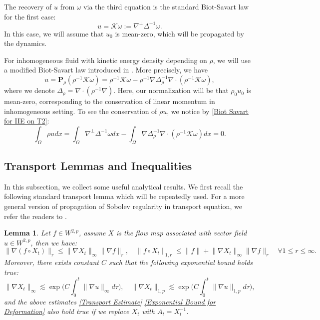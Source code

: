 \documentclass[12pt,letterpaper]{article}
\newcommand{\bP}{\mathbf{P}}
\newtheorem{lem}[thm]{Lemma}
\theoremstyle{plain}
\begin{document}
The recovery of $u$ from $\omega$ via the third equation is the standard Biot-Savart law for the first case:
\begin{equation*}
u=\mathcal K\omega:=\nabla^\perp\Delta^{-1}\omega.    
\end{equation*}
In this case, we will assume that $u_0$ is mean-zero, which will be propagated by the dynamics.

For inhomogeneous fluid with kinetic energy density depending on $\rho$, we will use a modified Biot-Savart law introduced in \cite{Pan2025LagrangianIIE}. More precisely, we have
\begin{equation}\label{Biot Savart for IIE on T2}
 u=\bP_\rho(\rho^{-1}\mathcal K\omega)= \rho^{-1}\mathcal K\omega-\rho^{-1}\nabla\Delta_{\rho}^{-1} \nabla\cdot( \rho^{-1}\mathcal K\omega),
\end{equation}
where we denote $\Delta_\rho=\nabla\cdot(\rho^{-1}\nabla)$. Here, our normalization will be that $\rho_0 u_0$ is mean-zero, corresponding to the conservation of linear momentum in inhomogeneous setting. To see the conservation of $\rho u$, we notice by \eqref{Biot Savart for IIE on T2}:
\begin{equation*}
 \int_\Omega \rho u dx =\int_\Omega \nabla^\perp\Delta^{-1}\omega dx-\int_\Omega \nabla\Delta_{\rho}^{-1} \nabla\cdot( \rho^{-1}\mathcal K\omega)dx=0.  
\end{equation*}

\subsection{Transport Lemmas and Inequalities}
In this subsection, we collect some useful analytical results. We first recall the following standard transport lemma which will be repeatedly used. For a more general version of propagation of Sobolev regularity in transport equation, we refer the readers to \cite{BCD11}.
\begin{lem}\label{Regularity of Transport}
 Let $f\in W^{2,p}$, assume  $X$ is the flow map associated with vector field $u\in W^{2,p}$, then we have:
 \begin{equation}\label{Transport Estimate}
   \lVert\nabla(f\circ X_t)\rVert_r\le \lVert\nabla X_t\rVert_\infty\lVert \nabla f\rVert_r,\quad \lVert f\circ X_t\rVert_{1,r}\le \lVert f\rVert+\lVert\nabla X_t\rVert_\infty \lVert \nabla f\rVert_r\quad\forall 1\le r\le \infty.
 \end{equation}
 Moreover, there exists constant $C$ such that the following exponential bound holds true:
 \begin{equation}\label{Exponential Bound for Deformation}
 \lVert\nabla X_t\rVert_\infty\lesssim \exp\bigg(C\int_0^t\lVert\nabla u\rVert_\infty d\tau\bigg),\quad \lVert \nabla X_t\rVert_{1,p}\lesssim \exp\bigg(C\int_0^t \lVert\nabla u\rVert_{1,p}d\tau\bigg),   
 \end{equation}
 and the above estimates \eqref{Transport Estimate} \eqref{Exponential Bound for Deformation} also hold true if we replace $X_t$ with $A_t=X_t^{-1}$.
\end{lem}
\end{document}
